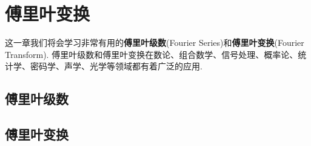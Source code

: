 \chapter{傅里叶变换}
这一章我们将会学习非常有用的\textbf{傅里叶级数}(Fourier Series)和\textbf{傅里叶变换}(Fourier Transform).
傅里叶级数和傅里叶变换在数论、组合数学、信号处理、概率论、统计学、密码学、声学、光学等领域都有着广泛的应用.


\section{傅里叶级数}
\label{sec:fourier_series}

\section{傅里叶变换}
\label{sec:fourier_transform}


% 

